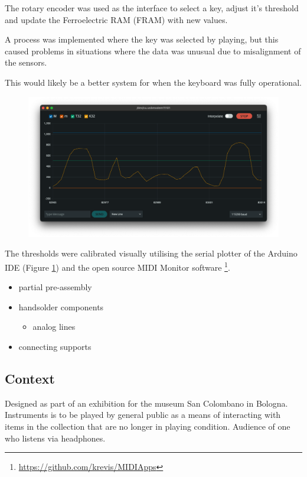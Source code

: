 The rotary encoder was used as the interface to select a key, adjust
it's threshold and update the Ferroelectric RAM (FRAM) with new values.

A process was implemented where the key was selected by playing, but
this caused problems in situations where the data was unusual due to
misalignment of the sensors.

This would likely be a better system for when the keyboard was fully
operational.

\begin{figure}  
  \centering
  \includegraphics[width=\linewidth]{images/serial_monitor.png} 
  \caption{} 
  \Description{} 
  \label{fig:serial_monitor}
\end{figure}

The thresholds were calibrated visually utilising the serial plotter of
the Arduino IDE (Figure \ref{fig:serial_monitor}) and the open source MIDI
Monitor software \footnote{\url{https://github.com/krevis/MIDIApps}}.

\begin{itemize}
\item
  partial pre-assembly
\item
  handsolder components

  \begin{itemize}
  \item
    analog lines
  \end{itemize}
\item
  connecting supports
\end{itemize}

\subsection{Context}\label{context}

Designed as part of an exhibition for the museum San Colombano in
Bologna. Instruments is to be played by general public as a means of
interacting with items in the collection that are no longer in playing
condition. Audience of one who listens via headphones.

